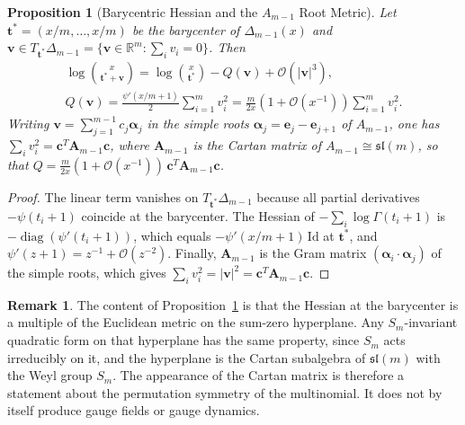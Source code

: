 \documentclass[11pt,a4paper,reqno]{amsart}
\newtheorem{proposition}[theorem]{Proposition}
\theoremstyle{definition}
\newtheorem{remark}[theorem]{Remark}
\numberwithin{equation}{section}
\providecommand{\R}{\mathbb{R}}
\newcommand{\Id}{\mathrm{Id}}
\providecommand{\R}{\mathbb{R}}
\begin{document}
\begin{proposition}[Barycentric Hessian and the $A_{m-1}$ Root Metric]
\label{thm:cartan_metric_emergence}
Let $\mathbf{t}^* = (x/m, \dots, x/m)$ be the barycenter of $\Delta_{m-1}(x)$ and $\mathbf{v} \in T_{\mathbf{t}^*}\Delta_{m-1} = \{\mathbf{v} \in \R^m : \sum_i v_i = 0\}$. Then
\begin{equation}
    \label{eq:cartan_quadratic}
    \begin{gathered}
    \log \binom{x}{\mathbf{t}^* + \mathbf{v}} = \log \binom{x}{\mathbf{t}^*} - Q(\mathbf{v}) + \mathcal{O}(|\mathbf{v}|^3), \\
    Q(\mathbf{v}) = \frac{\psi'(x/m + 1)}{2} \sum_{i=1}^m v_i^2 = \frac{m}{2x}\left(1 + \mathcal{O}(x^{-1})\right) \sum_{i=1}^m v_i^2 .
    \end{gathered}
\end{equation}
Writing $\mathbf{v} = \sum_{j=1}^{m-1} c_j \boldsymbol{\alpha}_j$ in the simple roots $\boldsymbol{\alpha}_j = \mathbf{e}_j - \mathbf{e}_{j+1}$ of $A_{m-1}$, one has $\sum_i v_i^2 = \mathbf{c}^T \mathbf{A}_{m-1} \mathbf{c}$, where $\mathbf{A}_{m-1}$ is the Cartan matrix of $A_{m-1} \cong \mathfrak{sl}(m)$, so that $Q = \frac{m}{2x}(1+\mathcal{O}(x^{-1}))\, \mathbf{c}^T \mathbf{A}_{m-1} \mathbf{c}$.
\end{proposition}
\begin{proof}
The linear term vanishes on $T_{\mathbf{t}^*}\Delta_{m-1}$ because all partial derivatives $-\psi(t_i+1)$ coincide at the barycenter. The Hessian of $-\sum_i \log\Gamma(t_i+1)$ is $-\operatorname{diag}(\psi'(t_i+1))$, which equals $-\psi'(x/m+1)\,\Id$ at $\mathbf{t}^*$, and $\psi'(z+1) = z^{-1} + \mathcal{O}(z^{-2})$. Finally, $\mathbf{A}_{m-1}$ is the Gram matrix $(\boldsymbol{\alpha}_i \cdot \boldsymbol{\alpha}_j)$ of the simple roots, which gives $\sum_i v_i^2 = |\mathbf{v}|^2 = \mathbf{c}^T \mathbf{A}_{m-1} \mathbf{c}$.
\end{proof}

\begin{remark}
The content of Proposition~\ref{thm:cartan_metric_emergence} is that the Hessian at the barycenter is a multiple of the Euclidean metric on the sum-zero hyperplane. Any $S_m$-invariant quadratic form on that hyperplane has the same property, since $S_m$ acts irreducibly on it, and the hyperplane is the Cartan subalgebra of $\mathfrak{sl}(m)$ with the Weyl group $S_m$. The appearance of the Cartan matrix is therefore a statement about the permutation symmetry of the multinomial. It does not by itself produce gauge fields or gauge dynamics.
\end{remark}
\end{document}
